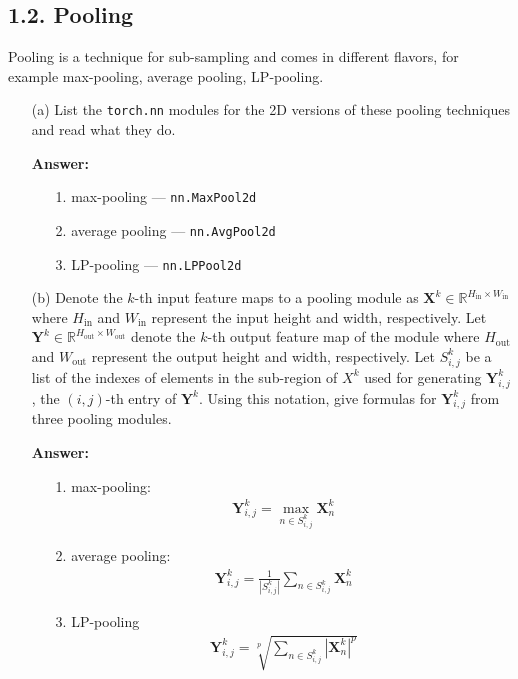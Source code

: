 \documentclass[12pt,letterpaper]{article}
\newcommand{\matr}[1]{\bm{#1}}     %
\begin{document}
\subsection*{1.2. Pooling}
Pooling is a technique for sub-sampling and comes in different flavors, for example max-pooling, average pooling, LP-pooling. 
\begin{itemize}
    \item[(a)] List the \texttt{torch.nn} modules for the 2D versions of these pooling techniques and read what they do.
    
    \textbf{Answer:}
    \begin{itemize}
        \item[1.] max-pooling — \texttt{nn.MaxPool2d}
        \item[2.] average pooling — \texttt{nn.AvgPool2d}
        \item[3.] LP-pooling — \texttt{nn.LPPool2d}
    \end{itemize}

    \item[(b)] Denote the $k$-th input feature maps to a pooling module as $\matr{X}^k \in \mathbb{R}^{H_{\textrm{in}}\times W_{\textrm{in}}} $ where $H_{\textrm{in}}$ and $W_{\text{in}}$ represent the input height and width, respectively. Let $\matr{Y}^k \in \mathbb{R}^{H_{\text{out}}\times W_{\textrm{out}}}$ denote the $k$-th output feature map of the module where $H_{\textrm{out}}$ and $W_{\textrm{out}}$ represent the output height and width, respectively. Let $S^{k}_{i,j}$ be a list of the indexes of elements in the sub-region of $X^k $ used for generating $\matr{Y}^k_{i,j}$, the $(i,j)$-th entry of $\matr{Y}^{k}$. 
    Using this notation, give formulas for $\matr{Y}^k_{i,j} $ from three pooling modules.
    
    \textbf{Answer:}
    \begin{itemize}
        \item[1.] max-pooling: 
        \begin{align}
            \matr{Y}^k_{i,j} = \max_{n \in S^k_{i,j}}\matr{X}^k_n  
        \end{align}
        
        \item[2.] average pooling:
        \begin{align}
            \matr{Y}^k_{i,j} = \frac{1}{|S^k_{i,j}|}\sum_{n \in S^k_{i,j}}\matr{X}^k_n  
        \end{align}
        
        \item[3.] LP-pooling
        \begin{align}
            \matr{Y}^k_{i,j} = \sqrt[p]{\sum_{n \in S^k_{i,j}}|\matr{X}^k_n|^p}
        \end{align}
    \end{itemize}
   

\end{itemize}
\end{document}
